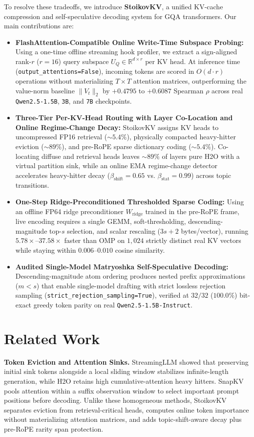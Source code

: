 \documentclass[conference]{IEEEtran}
\begin{document}
To resolve these tradeoffs, we introduce \textbf{StoikovKV}, a unified KV-cache compression and self-speculative decoding system for GQA transformers. Our main contributions are:
\begin{itemize}
    \item \textbf{FlashAttention-Compatible Online Write-Time Subspace Probing:} Using a one-time offline streaming hook profiler, we extract a sign-aligned rank-$r$ ($r = 16$) query subspace $U_Q \in \mathbb{R}^{d \times r}$ per KV head. At inference time (\texttt{output\_attentions=False}), incoming tokens are scored in $O(d \cdot r)$ operations without materializing $T \times T$ attention matrices, outperforming the value-norm baseline $\|V_t\|_2$ by $+0.4795$ to $+0.6087$ Spearman $\rho$ across real \texttt{Qwen2.5-1.5B}, \texttt{3B}, and \texttt{7B} checkpoints.
    \item \textbf{Three-Tier Per-KV-Head Routing with Layer Co-Location and Online Regime-Change Decay:} StoikovKV assigns KV heads to uncompressed FP16 retrieval ($\sim 5.4\%$), physically compacted heavy-hitter eviction ($\sim 89\%$), and pre-RoPE sparse dictionary coding ($\sim 5.4\%$). Co-locating diffuse and retrieval heads leaves $\sim 89\%$ of layers pure H2O with a virtual partition sink, while an online EMA regime-change detector accelerates heavy-hitter decay ($\beta_{\text{shift}} = 0.65$ vs. $\beta_{\text{stat}} = 0.99$) across topic transitions.
    \item \textbf{One-Step Ridge-Preconditioned Thresholded Sparse Coding:} Using an offline FP64 ridge preconditioner $W_{\text{ridge}}$ trained in the pre-RoPE frame, live encoding requires a single GEMM, soft-thresholding, descending-magnitude top-$s$ selection, and scalar rescaling ($3s + 2$ bytes/vector), running $5.78\times$--$37.58\times$ faster than OMP on $1{,}024$ strictly distinct real KV vectors while staying within $0.006$--$0.010$ cosine similarity.
    \item \textbf{Audited Single-Model Matryoshka Self-Speculative Decoding:} Descending-magnitude atom ordering produces nested prefix approximations ($m < s$) that enable single-model drafting with strict lossless rejection sampling (\texttt{strict\_rejection\_sampling=True}), verified at $32/32$ ($100.0\%$) bit-exact greedy token parity on real \texttt{Qwen2.5-1.5B-Instruct}.
\end{itemize}

\section{Related Work}
\textbf{Token Eviction and Attention Sinks.} StreamingLLM \cite{b3} showed that preserving initial sink tokens alongside a local sliding window stabilizes infinite-length generation, while H2O \cite{b2} retains high cumulative-attention heavy hitters. SnapKV \cite{b5} pools attention within a suffix observation window to select important prompt positions before decoding. Unlike these homogeneous methods, StoikovKV separates eviction from retrieval-critical heads, computes online token importance without materializing attention matrices, and adds topic-shift-aware decay plus pre-RoPE rarity span protection.
\end{document}

